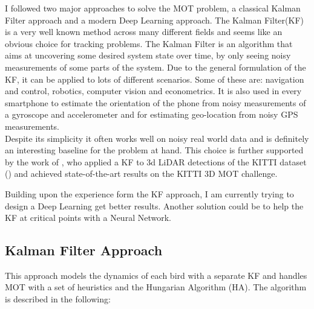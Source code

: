 \documentclass{article}
\begin{document}
I followed two major approaches to solve the MOT problem, a classical Kalman Filter approach and a modern Deep Learning approach. The Kalman Filter(KF) is a very well known method across many different fields and seems like an obvious choice for tracking problems. The Kalman Filter is an algorithm that aims at uncovering some desired system state over time, by only seeing noisy measurements of some parts of the system. Due to the general formulation of the KF, it can be applied to lots of different scenarios. Some of these are: navigation and control, robotics, computer vision and econometrics. It is also used in every smartphone to estimate the orientation of the phone from noisy measurements of a gyroscope and accelerometer and for estimating geo-location from noisy GPS measurements. \\%
Despite its simplicity it often works well on noisy real world data and is definitely an interesting baseline for the problem at hand. This choice is further supported by the work of \cite{3d_kalman}, who applied a KF to 3d LiDAR detections of the KITTI dataset (\cite{kitti}) and achieved state-of-the-art results on the KITTI 3D MOT challenge. %

Building upon the experience form the KF approach, I am currently trying to design a Deep Learning get better results. Another solution could be to help the KF at critical points with a Neural Network. %





\subsection{Kalman Filter Approach}
\label{kalman_filter_approach}







This approach models the dynamics of each bird with a separate KF and handles MOT with a set of heuristics and the Hungarian Algorithm (HA). %
The algorithm is described in the following: \\
\end{document}
